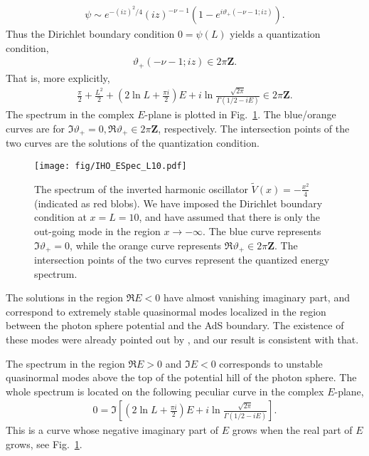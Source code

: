 \documentclass[a4paper,11pt]{article}
\begin{document}
\begin{align}
    \psi
    \sim e^{-(iz)^2/4}(iz)^{-\nu-1}
    \left( 1-e^{i\vartheta_+(-\nu-1;iz)} \right).
\end{align}
Thus the Dirichlet boundary condition $0=\psi(L)$ yields a quantization condition,
\begin{align}
    \vartheta_+(-\nu-1;iz)
    \in 2\pi \mathbf{Z}.
\end{align}
That is, more explicitly,
\begin{align}
     \frac{\pi}{2} +\frac{L^2}{2}
    +\left( 2\ln L + \frac{\pi i}{2} \right)E
    +i\ln\frac{\sqrt{2\pi}}{\Gamma(1/2-iE)}
    \in 2\pi \mathbf{Z}.
    \label{eq:theta_2piZ}
\end{align}
The spectrum in the complex $E$-plane is plotted in Fig.~\ref{fig:IHO_ESpec_L10}.
The blue/orange curves are for 
$\Im\vartheta_+=0, \Re\vartheta_+\in 2\pi\mathbf{Z}$, respectively.
The intersection points of the two curves are the solutions of the quantization condition.


\begin{figure}[t]
    \centering
    \texttt{[image: fig/IHO\_ESpec\_L10.pdf]}
    \caption{
	The spectrum of the inverted harmonic oscillator
        $\widetilde{V}(x)=-\frac{x^2}{4}$ (indicated as red blobs).
        We have imposed the Dirichlet boundary condition at $x=L=10$,
        and have assumed that there is only the out-going mode in the region $x\rightarrow-\infty$.
        The blue curve represents $\Im\vartheta_+=0$,
        while the orange curve represents $\Re\vartheta_+\in 2\pi\mathbf{Z}$.
        The intersection points of the two curves represent the quantized energy spectrum.
    }
    \label{fig:IHO_ESpec_L10}
\end{figure}



The solutions in the region $\Re E<0$ have almost vanishing imaginary part, and correspond to extremely stable quasinormal modes localized in the region between the photon sphere potential and the AdS boundary.
The existence of these modes were already pointed out by \cite{Festuccia:2008zx}, and 
our result is consistent with that.


The spectrum in the region $\Re E>0$ and $\Im E<0$ corresponds to unstable quasinormal modes above the top of the potential hill of the photon sphere.
The whole spectrum is located on the following peculiar curve in the complex $E$-plane,
\begin{align}
    \label{eq:IHO_Spec_Curve}
    0 = \Im\left[
        \left( 2\ln L + \frac{\pi i}{2} \right)E
        +i\ln\frac{\sqrt{2\pi}}{\Gamma(1/2-iE)}
    \right].
\end{align}
This is a curve whose negative imaginary part of $E$ grows when the real part of $E$ grows, see Fig.~\ref{fig:IHO_ESpec_L10}.
\end{document}
